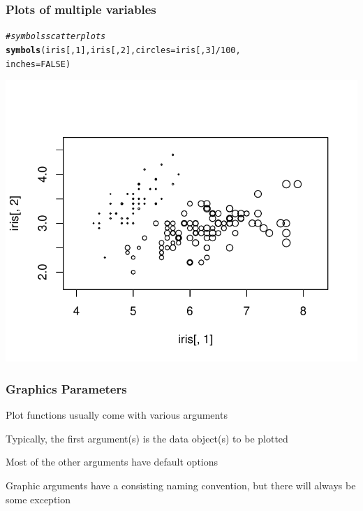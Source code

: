 \documentclass[12pt]{beamer}\usepackage[]{graphicx}\usepackage[]{color}
\makeatletter
\newcommand{\hlnum}[1]{\textcolor[rgb]{0.686,0.059,0.569}{#1}}%
\newcommand{\hlcom}[1]{\textcolor[rgb]{0.678,0.584,0.686}{\textit{#1}}}%
\newcommand{\hlopt}[1]{\textcolor[rgb]{0,0,0}{#1}}%
\newcommand{\hlstd}[1]{\textcolor[rgb]{0.345,0.345,0.345}{#1}}%
\newcommand{\hlkwc}[1]{\textcolor[rgb]{0.333,0.667,0.333}{#1}}%
\newcommand{\hlkwd}[1]{\textcolor[rgb]{0.737,0.353,0.396}{\textbf{#1}}}%
\newenvironment{kframe}{%
 \def\at@end@of@kframe{}%
 \ifinner\ifhmode%
  \def\at@end@of@kframe{\end{minipage}}%
  \begin{minipage}{\columnwidth}%
 \fi\fi%
 \def\FrameCommand##1{\hskip\@totalleftmargin \hskip-\fboxsep
 \colorbox{shadecolor}{##1}\hskip-\fboxsep
     \hskip-\linewidth \hskip-\@totalleftmargin \hskip\columnwidth}%
 \MakeFramed {\advance\hsize-\width
   \@totalleftmargin\z@ \linewidth\hsize
   \@setminipage}}%
 {\par\unskip\endMakeFramed%
 \at@end@of@kframe}
\newenvironment{knitrout}{}{} %
\makeatother
\begin{document}
\begin{frame}[fragile]
\frametitle{Plots of multiple variables}
\begin{knitrout}\scriptsize
{}\color{fgcolor}\begin{kframe}
\begin{alltt}
\hlcom{# symbols scatter plots}
\hlkwd{symbols}\hlstd{(iris[,} \hlnum{1}\hlstd{], iris[,} \hlnum{2}\hlstd{],} \hlkwc{circles} \hlstd{= iris[,} \hlnum{3}\hlstd{]}\hlopt{/}\hlnum{100}\hlstd{,}
        \hlkwc{inches} \hlstd{=} \hlnum{FALSE}\hlstd{)}
\end{alltt}
\end{kframe}

{\centering \includegraphics[width=.8\linewidth,height=.65\linewidth]{figure/unnamed-chunk-27-1} 

}



\end{knitrout}
\end{frame}


\begin{frame}
\frametitle{Graphics Parameters}

\bi
  \item Plot functions usually come with various arguments
  \item Typically, the first argument(s) is the data object(s) to be plotted
  \item Most of the other arguments have default options
  \item Graphic arguments have a consisting naming convention, but there will always be some exception
\ei
\eb

\end{frame}
\end{document}
